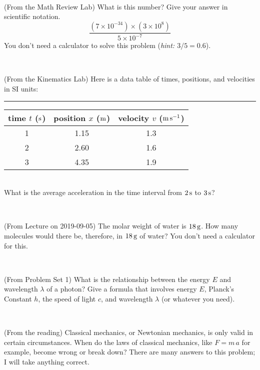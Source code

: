 \documentclass[12pt, letterpaper]{article}
\begin{document}
\vfill ~

\begin{problem} (From the Math Review Lab)
What is this number? Give your answer in scientific notation.
$$
\frac{(7\times10^{-34})\times(3\times10^8)}{5\times10^{-7}}
$$
You don't need a calculator to solve this problem (\textit{hint: $3/5=0.6$}).
\end{problem}


\vfill ~


\clearpage


\begin{problem} (From the Kinematics Lab)
Here is a data table of times, positions, and velocities in SI units:\\
\rule{1.0in}{0pt}\begin{tabular}{c|c|c}
time $t$ ($\mathrm{s}$) & position $x$ ($\mathrm{m}$) & velocity $v$ ($\mathrm{m}\,\mathrm{s}^{-1}$) \\
\hline
1 & 1.15 & 1.3 \\
2 & 2.60 & 1.6 \\
3 & 4.35 & 1.9 \\
\hline
\end{tabular}\\
What is the average acceleration in the time interval from $2\,\mathrm{s}$ to $3\,\mathrm{s}$?
\end{problem}


\vfill ~

\begin{problem} (From Lecture on 2019-09-05)
The molar weight of water is $18\,\mathrm{g}$. How many molecules would there
be, therefore, in $18\,\mathrm{g}$ of water? You don't need a calculator for
this.
\end{problem}


\vfill ~

\begin{problem} (From Problem Set 1)
What is the relationship between the energy $E$ and wavelength
$\lambda$ of a photon? Give a formula that involves energy $E$,
Planck's Constant $h$, the speed of light $c$, and wavelength
$\lambda$ (or whatever you need).
\end{problem}

\vfill ~

\begin{problem} (From the reading)
Classical mechanics, or Newtonian mechanics, is only valid in certain
circumstances. When do the laws of classical mechanics, like $F =
m\,a$ for example, become wrong or break down? There are many answers
to this problem; I will take anything correct.
\end{problem}
\end{document}
